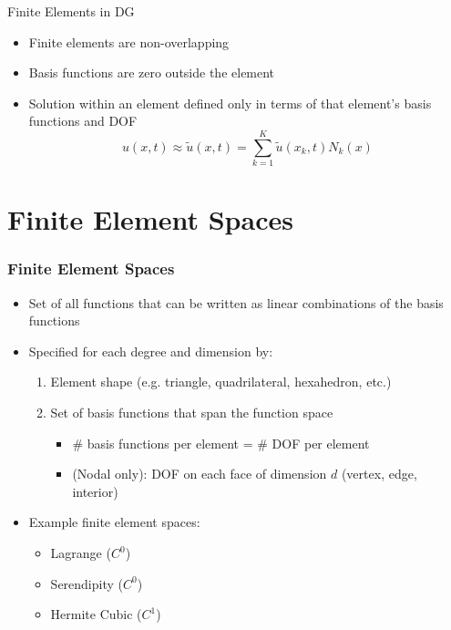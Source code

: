 \documentclass[serif,12pt]{beamer}
\begin{document}
\begin{frame}{Finite Elements in DG}
  \begin{itemize}
  	\item Finite elements are non-overlapping
  	\item Basis functions are zero outside the element
  	\item Solution within an element defined only in terms of that element's basis functions and DOF
  	\[u(x,t) \approx \tilde{u}(x,t) = \displaystyle\sum_{k=1}^{K}\tilde{u}(x_k,t)N_k(x) \]
  \end{itemize}
\end{frame}

\section{Finite Element Spaces}
\begin{frame}
\frametitle{Finite Element Spaces}
	\begin{itemize}
		\item Set of all functions that can be written as linear combinations of the basis functions
		\item Specified for each degree and dimension by:
		\begin{enumerate}
			\item Element shape (e.g. triangle, quadrilateral, hexahedron, etc.)
			\item Set of basis functions that span the function space
			\begin{itemize}
				\item \# basis functions per element = \# DOF per element				
				\item (Nodal only): DOF on each face of dimension $d$ (vertex, edge, interior)
			\end{itemize}
		\end{enumerate}
		\item Example finite element spaces:
		\begin{itemize}
		\item Lagrange ($C^0$)
		\item Serendipity ($C^0$)
		\item Hermite Cubic ($C^1$)
		\end{itemize}
	\end{itemize}
\end{frame}
\end{document}
